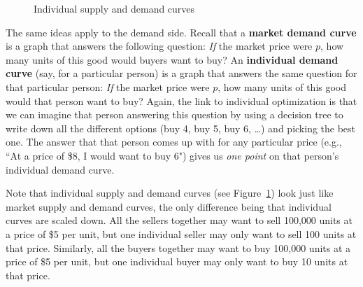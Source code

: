 \begin{figure}[bt]
\centering
{}
%
\hspace{2cm}
%
\caption{Individual supply and demand curves}
\label{fig:individualtogether} %
\end{figure}


The same ideas apply to the demand side. Recall that a \textbf{market demand curve} is a graph that answers the following question: \emph{If} the market price were $p$, how many units of this good would buyers want to buy? An \textbf{individual demand curve} (say, for a particular person) is a graph that answers the same question for that particular person: \emph{If} the market price were $p$, how many units of this good would that person want to buy? Again, the link to individual optimization is that we can imagine that person answering this question by using a decision tree to write down all the different options (buy 4, buy 5, buy 6, \ldots) and picking the best one. The answer that that person comes up with for any particular price (e.g., ``At a price of \$8, I would want to buy 6") gives us \emph{one point} on that person's individual demand curve.

Note that individual supply and demand curves (see Figure~\ref{fig:individualtogether}) look just like market supply and demand curves, the only difference being that individual curves are scaled down. All the sellers together may want to sell 100,000 units at a price of \$5 per unit, but one individual seller may only want to sell 100 units at that price. Similarly, all the buyers together may want to buy 100,000 units at a price of \$5 per unit, but one individual buyer may only want to buy 10 units at that price.


